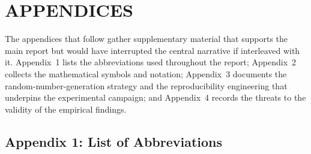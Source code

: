 \section{APPENDICES}

The appendices that follow gather supplementary material that supports the main report but would have interrupted the central narrative if interleaved with it. Appendix~1 lists the abbreviations used throughout the report; Appendix~2 collects the mathematical symbols and notation; Appendix~3 documents the random-number-generation strategy and the reproducibility engineering that underpins the experimental campaign; and Appendix~4 records the threats to the validity of the empirical findings.

\subsection*{Appendix 1: List of Abbreviations}
\renewcommand{\arraystretch}{1.35}
